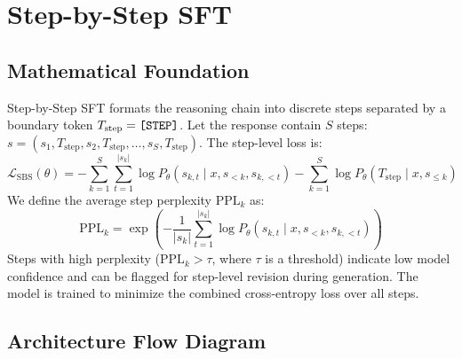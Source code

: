 \documentclass{article}
\begin{document}
\newpage
\section{Step-by-Step SFT}

\subsection{Mathematical Foundation}
Step-by-Step SFT formats the reasoning chain into discrete steps separated by a boundary token $T_{\text{step}} = \text{\texttt{[STEP]}}$. Let the response contain $S$ steps: $s = (s_1, T_{\text{step}}, s_2, T_{\text{step}}, \dots, s_S, T_{\text{step}})$. The step-level loss is:
\begin{equation}
  \mathcal{L}_{\text{SBS}}(\theta) = -\sum_{k=1}^S \sum_{t=1}^{|s_k|} \log P_\theta(s_{k,t} \mid x, s_{<k}, s_{k,<t}) - \sum_{k=1}^S \log P_\theta(T_{\text{step}} \mid x, s_{\le k})
\end{equation}
We define the average step perplexity $\text{PPL}_k$ as:
\begin{equation}
  \text{PPL}_k = \exp\left( -\frac{1}{|s_k|} \sum_{t=1}^{|s_k|} \log P_\theta(s_{k,t} \mid x, s_{<k}, s_{k,<t}) \right)
\end{equation}
Steps with high perplexity ($\text{PPL}_k > \tau$, where $\tau$ is a threshold) indicate low model confidence and can be flagged for step-level revision during generation.
The model is trained to minimize the combined cross-entropy loss over all steps.

\subsection{Architecture Flow Diagram}
\end{document}
